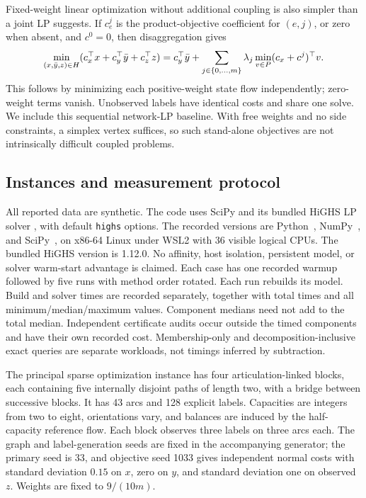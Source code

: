 Fixed-weight linear optimization without additional coupling is also simpler
than a joint LP suggests. If $c^j_e$ is the product-objective coefficient
for $(e,j)$, or zero when absent, and $c^0=0$, then disaggregation gives
\begin{equation}\label{eq:independent-network-objectives}
 \min_{(x,\bar y,z)\in H}
       (c_x^\top x+c_y^\top\bar y+c_z^\top z)
 =c_y^\top\bar y+
   \sum_{j\in\{0,\ldots,m\}}\lambda_j
       \min_{v\in P}(c_x+c^j)^\top v.
\end{equation}
This follows by minimizing each positive-weight state flow independently;
zero-weight terms vanish. Unobserved labels have identical costs and share
one solve. We include this sequential network-LP baseline. With free weights
and no side constraints, a simplex vertex suffices, so such stand-alone
objectives are not intrinsically difficult coupled problems.

\subsection{Instances and measurement protocol}

All reported data are synthetic. The code uses SciPy
\citep{Virtanen2020} and its bundled HiGHS LP solver
\citep{HuangfuHall2018}, with default \texttt{highs} options.
The recorded versions are Python~\BenchPython, NumPy~\BenchNumpy,
and SciPy~\BenchScipy, on x86-64 Linux under WSL2 with 36 visible
logical CPUs. The bundled HiGHS version is 1.12.0. No affinity, host
isolation, persistent model, or solver warm-start advantage is claimed.
Each case has one recorded warmup followed by five runs with method order
rotated. Each run rebuilds its model. Build and solver times are recorded
separately, together with total times and all minimum/median/maximum values.
Component medians need not add to the total median. Independent certificate
audits occur outside the timed components and have their own recorded cost.
Membership-only and decomposition-inclusive exact queries are separate
workloads, not timings inferred by subtraction.

The principal sparse optimization instance has four articulation-linked
blocks, each containing five internally disjoint paths of length two,
with a bridge between successive blocks. It has 43 arcs and 128 explicit
labels. Capacities are integers from two to eight, orientations vary, and
balances are induced by the half-capacity reference flow. Each block observes
three labels on three arcs each. The graph and label-generation seeds are
fixed in the accompanying generator; the primary seed is 33, and objective
seed 1033 gives independent normal costs with standard deviation $0.15$
on $x$, zero on $y$, and standard deviation one on observed $z$.
Weights are fixed to $9/(10m)$.

